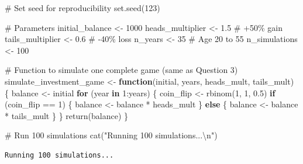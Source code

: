 \documentclass[
  letterpaper,
  DIV=11,
  numbers=noendperiod]{scrartcl}
\newenvironment{Shaded}{\begin{snugshade}}{\end{snugshade}}
\newcommand{\CommentTok}[1]{\textcolor[rgb]{0.37,0.37,0.37}{#1}}
\newcommand{\ControlFlowTok}[1]{\textcolor[rgb]{0.00,0.23,0.31}{\textbf{#1}}}
\newcommand{\DecValTok}[1]{\textcolor[rgb]{0.68,0.00,0.00}{#1}}
\newcommand{\FloatTok}[1]{\textcolor[rgb]{0.68,0.00,0.00}{#1}}
\newcommand{\FunctionTok}[1]{\textcolor[rgb]{0.28,0.35,0.67}{#1}}
\newcommand{\NormalTok}[1]{\textcolor[rgb]{0.00,0.23,0.31}{#1}}
\newcommand{\OtherTok}[1]{\textcolor[rgb]{0.00,0.23,0.31}{#1}}
\newcommand{\SpecialCharTok}[1]{\textcolor[rgb]{0.37,0.37,0.37}{#1}}
\newcommand{\StringTok}[1]{\textcolor[rgb]{0.13,0.47,0.30}{#1}}
\begin{document}
\begin{Shaded}
\begin{Highlighting}[]
\CommentTok{\# Set seed for reproducibility}
\FunctionTok{set.seed}\NormalTok{(}\DecValTok{123}\NormalTok{)}

\CommentTok{\# Parameters}
\NormalTok{initial\_balance }\OtherTok{\textless{}{-}} \DecValTok{1000}
\NormalTok{heads\_multiplier }\OtherTok{\textless{}{-}} \FloatTok{1.5}  \CommentTok{\# +50\% gain}
\NormalTok{tails\_multiplier }\OtherTok{\textless{}{-}} \FloatTok{0.6}  \CommentTok{\# {-}40\% loss}
\NormalTok{n\_years }\OtherTok{\textless{}{-}} \DecValTok{35}  \CommentTok{\# Age 20 to 55}
\NormalTok{n\_simulations }\OtherTok{\textless{}{-}} \DecValTok{100}

\CommentTok{\# Function to simulate one complete game (same as Question 3)}
\NormalTok{simulate\_investment\_game }\OtherTok{\textless{}{-}} \ControlFlowTok{function}\NormalTok{(initial, years, heads\_mult, tails\_mult) \{}
\NormalTok{  balance }\OtherTok{\textless{}{-}}\NormalTok{ initial}
  \ControlFlowTok{for}\NormalTok{ (year }\ControlFlowTok{in} \DecValTok{1}\SpecialCharTok{:}\NormalTok{years) \{}
\NormalTok{    coin\_flip }\OtherTok{\textless{}{-}} \FunctionTok{rbinom}\NormalTok{(}\DecValTok{1}\NormalTok{, }\DecValTok{1}\NormalTok{, }\FloatTok{0.5}\NormalTok{)}
    \ControlFlowTok{if}\NormalTok{ (coin\_flip }\SpecialCharTok{==} \DecValTok{1}\NormalTok{) \{}
\NormalTok{      balance }\OtherTok{\textless{}{-}}\NormalTok{ balance }\SpecialCharTok{*}\NormalTok{ heads\_mult}
\NormalTok{    \} }\ControlFlowTok{else}\NormalTok{ \{}
\NormalTok{      balance }\OtherTok{\textless{}{-}}\NormalTok{ balance }\SpecialCharTok{*}\NormalTok{ tails\_mult}
\NormalTok{    \}}
\NormalTok{  \}}
  \FunctionTok{return}\NormalTok{(balance)}
\NormalTok{\}}

\CommentTok{\# Run 100 simulations}
\FunctionTok{cat}\NormalTok{(}\StringTok{"Running 100 simulations...}\SpecialCharTok{\textbackslash{}n}\StringTok{"}\NormalTok{)}
\end{Highlighting}
\end{Shaded}

\begin{verbatim}
Running 100 simulations...
\end{verbatim}
\end{document}
